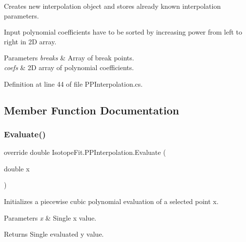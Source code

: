 Creates new interpolation object and stores already known interpolation parameters. 

Input polynomial coefficients have to be sorted by increasing power from left to right in 2D array. 


\begin{DoxyParams}{Parameters}
{\em breaks} & Array of break points.\\
\hline
{\em coefs} & 2D array of polynomial coefficients.\\
\hline
\end{DoxyParams}


Definition at line 44 of file P\+P\+Interpolation.\+cs.



\subsection{Member Function Documentation}
\mbox{\label{class_isotope_fit_1_1_p_p_interpolation_a1849081f6f187cb948c7f8f7dba866af}} 
\subsubsection{\texorpdfstring{Evaluate()}{Evaluate()}\hspace{0.1cm}{\footnotesize\ttfamily [1/2]}}
{\footnotesize\ttfamily override double Isotope\+Fit.\+P\+P\+Interpolation.\+Evaluate (\begin{DoxyParamCaption}\item[{double}]{x }\end{DoxyParamCaption})\hspace{0.3cm}{\ttfamily [virtual]}}



Initializes a piecewise cubic polynomial evaluation of a selected point x. 


\begin{DoxyParams}{Parameters}
{\em x} & Single x value.\\
\hline
\end{DoxyParams}
\begin{DoxyReturn}{Returns}
Single evaluated y value.
\end{DoxyReturn}


